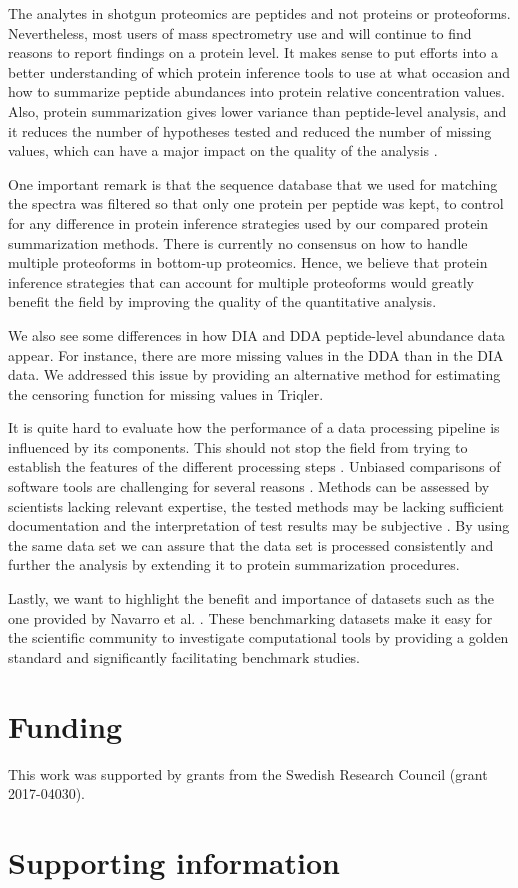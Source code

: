 \documentclass[10pt,letterpaper]{article}
\begin{document}
The analytes in shotgun proteomics are peptides and not proteins or proteoforms. Nevertheless, most users of mass spectrometry use and will continue to find reasons to report findings on a protein level. It makes sense to put efforts into a better understanding of which protein inference tools to use at what occasion and how to summarize peptide abundances into protein relative concentration values. Also, protein summarization gives lower variance than peptide-level analysis, and it reduces the number of hypotheses tested and reduced the number of missing values, which can have a major impact on the quality of the analysis \cite{plubell2021can}.   

One important remark is that the sequence database that we used for matching the spectra was filtered so that only one protein per peptide was kept, to control for any difference in protein inference strategies used by our compared protein summarization methods. There is currently no consensus on how to handle multiple proteoforms in bottom-up proteomics. Hence, we believe that protein inference strategies that can account for multiple proteoforms would greatly benefit the field by improving the quality of the quantitative analysis. 

We also see some differences in how DIA and DDA peptide-level abundance data appear. For instance, there are more missing values in the DDA than in the DIA data. We addressed this issue by providing an alternative method for estimating the censoring function for missing values in Triqler.

It is quite hard to evaluate how the performance of a data processing pipeline is influenced by its components. This should not stop the field from trying to establish the features of the different processing steps \cite{dufresne2014abrf,gatto2016testing,navarro2016multicenter}. Unbiased comparisons of software tools are challenging for several reasons \cite{dufresne2014abrf}. Methods can be assessed by scientists lacking relevant expertise, the tested methods may be lacking sufficient documentation and the interpretation of test results may be subjective \cite{yates2012toward,leprevost2014best,pak2013clustering,faircomparison2015}. By using the same data set we can assure that the data set is processed consistently and further the analysis by extending it to protein summarization procedures.

Lastly, we want to highlight the benefit and importance of datasets such as the one provided by Navarro et al. \cite{navarro2016multicenter}. These benchmarking datasets make it easy for the scientific community to investigate computational tools by providing a golden standard and significantly facilitating benchmark studies. 

\section*{Funding}

This work was supported by grants from the Swedish Research Council (grant 2017-04030).

\section*{Supporting information}


%

\end{document}
